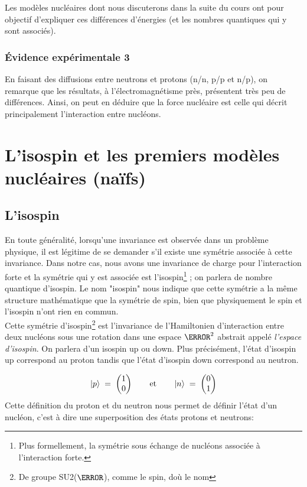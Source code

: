 Les modèles nucléaires dont nous discuterons dans la suite du cours ont pour objectif d'expliquer ces différences d'énergies (et les nombres quantiques qui y sont associés).


\subsubsection{Évidence expérimentale 3}

En faisant des diffusions entre neutrons et protons (n/n, p/p et n/p), on remarque que les résultats, à l'électromagnétisme près, présentent très peu de différences. Ainsi, on peut en déduire que la force nucléaire est celle qui décrit principalement l'interaction entre nucléons.

\section{L'isospin et les premiers modèles nucléaires (naïfs)}

\subsection{L'isospin}

En toute généralité, lorsqu'une invariance est observée dans un problème physique, il est légitime de se demander s'il existe une symétrie associée à cette invariance. Dans notre cas, nous avons une invariance de charge pour l'interaction forte et la symétrie qui y est associée est l'isospin\footnote{Plus formellement, la symétrie sous échange de nucléons associée à l'interaction forte.} ; on parlera de nombre quantique d'isospin. Le nom "isospin" nous indique que cette symétrie a la même structure mathématique que la symétrie de spin, bien que physiquement le spin et l'isospin n'ont rien en commun.\\

Cette symétrie d'isospin\footnote{De groupe SU2($\C$), comme le spin, doù le nom} est l'invariance de l'Hamiltonien d'interaction entre deux nucléons sous une rotation dans une espace $\C^2$ abstrait appelé \emph{l'espace d'isospin}. On parlera d'un isospin up ou down. Plus précisément, l'état d'isospin up correspond au proton tandis que l'état d'isospin down correspond au neutron.

\[
    \ket{p} \; = \; 
    \begin{pmatrix}
    1 \\ 0
    \end{pmatrix}
    \qquad \text{et}\qquad
    \ket{n} \; = \; 
    \begin{pmatrix}
    0 \\ 1
    \end{pmatrix}
\]
Cette définition du proton et du neutron nous permet de définir l'état d'un nucléon, c'est à dire une superposition des états protons et neutrons:

